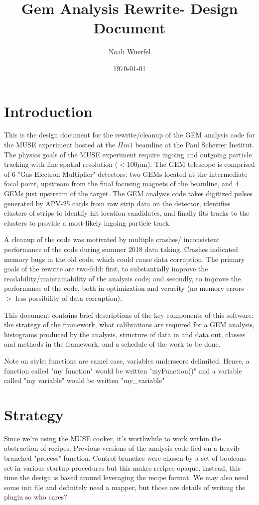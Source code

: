 \documentclass[11pt]{article}
\title{Gem Analysis Rewrite- Design Document}
\author{Noah Wuerfel}
\date{\today}
\begin{document}
\maketitle
\tableofcontents
\clearpage


\section{Introduction}
	This is the design document for the rewrite/cleanup of the GEM analysis code for the MUSE experiment hosted at the $\Pi m 1$ beamline at the Paul Scherrer Institut. The physics goals of the MUSE experiment require ingoing and outgoing particle tracking with fine spatial resolution ($<$100$\mu$m). The GEM telescope is comprised of 6 "Gas Electron Multiplier" detectors: two GEMs located at the intermediate focal point, upstream from the final focusing magnets of the beamline, and 4 GEMs just upstream of the target. The GEM analysis code takes digitized pulses generated by APV-25 cards from raw strip data on the detector, identifies clusters of strips to identify hit location candidates, and finally fits tracks to the clusters to provide a most-likely ingoing particle track. 
	
	A cleanup of the code was motivated by multiple crashes/ inconsistent performance of the code during summer 2018 data taking. Crashes indicated memory bugs in the old code, which could cause data corruption. The primary goals of the rewrite are two-fold: first, to substantially improve the readability/maintainability of the analysis code; and secondly, to improve the performance of the code, both in optimization and veracity (no memory errors -$>$ less possibility of data corruption).
	
	This document contains brief descriptions of the key components of this software: the strategy of the framework, what calibrations are required for a GEM analysis, histograms produced by the analysis, structure of data in and data out, classes and methods in the framework, and a schedule of the work to be done.
	
	Note on style: functions are camel case, variables underscore delimited. Hence, a function called "my function" would be written "myFunction()" and a variable called "my variable" would be written "my\_variable"
	
\section{Strategy}
	Since we're using the MUSE cooker, it's worthwhile to work within the abstraction of recipes. Previous versions of the analysis code lied on a heavily branched "process" function. Control branches were chosen by a set of booleans set in various startup procedures but this makes recipes opaque. Instead, this time the design is based around leveraging the recipe format. We may also need some init file and definitely need a mapper, but those are details of writing the plugin so who cares?
	
\end{document}
